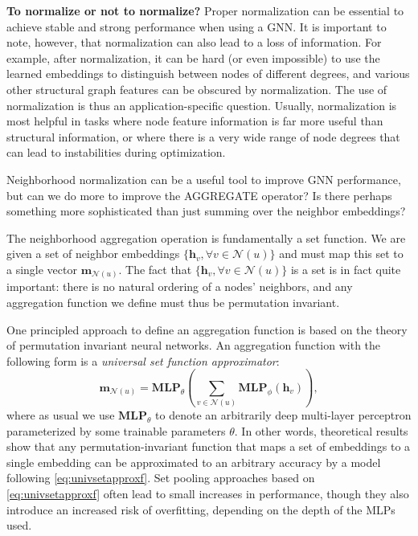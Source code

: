 \documentclass[10pt]{book}
\let\defaultmarginpar\marginpar
\renewcommand\marginpar[2][]{\defaultmarginpar{\itshape\color{gray}#2}}
\begin{document}
\textbf{To normalize or not to normalize?} Proper normalization can be essential to achieve stable and strong performance when using a GNN. It is important to note, however, that normalization can also lead to a loss of information. For example, after normalization, it can be hard (or even impossible) to use the learned embeddings to distinguish between nodes of different degrees, and various other structural graph features can be obscured by normalization. The use of normalization is thus an application-specific question. Usually, normalization is most helpful in tasks where node feature information is far more useful than structural information, or where there is a very wide range of node degrees that can lead to instabilities during optimization.

Neighborhood normalization can be a useful tool to improve GNN performance, but can we do more to improve the AGGREGATE operator? Is there perhaps something more sophisticated than just summing over the neighbor embeddings?

The neighborhood aggregation operation is fundamentally a set function. We are given a set of neighbor embeddings $\{\mathbf h_v, \forall v \in \mathcal N(u)\}$ and must map this set to a single vector $\mathbf m_{\mathcal N(u)}$. The fact that $\{\mathbf h_v, \forall v \in \mathcal N(u)\}$ is a set is in fact quite important: there is no natural ordering of a nodes’ neighbors, and any aggregation function we define must thus be permutation invariant.

One principled approach to define an aggregation function is based on the theory of permutation invariant neural networks. An aggregation function with the following form is a \emph{universal set function approximator}\marginpar{universal set function approximator}:
\begin{equation}
    \mathbf m_{\mathcal N(u)} = \textbf{MLP}_\theta \left( \sum_{v \in \mathcal N(u)} \textbf{MLP}_\phi (\mathbf h_v) \right),
    \label{eq:univsetapproxf}
\end{equation}
where as usual we use $\textbf{MLP}_\theta$ to denote an arbitrarily deep multi-layer perceptron parameterized by some trainable parameters $\theta$. In other words, theoretical results show that any permutation-invariant function that maps a set of embeddings to a single embedding can be approximated to an arbitrary accuracy by a model following \autoref{eq:univsetapproxf}. Set pooling approaches based on \autoref{eq:univsetapproxf} often lead to small increases in performance, though they also introduce an increased risk of overfitting, depending on the depth of the MLPs used.
\end{document}

